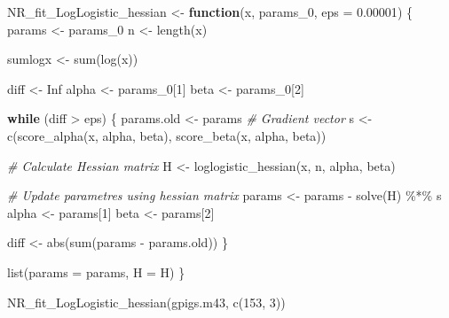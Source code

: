 \documentclass[
]{article}
\newenvironment{Shaded}{\begin{snugshade}}{\end{snugshade}}
\newcommand{\AttributeTok}[1]{\textcolor[rgb]{0.77,0.63,0.00}{#1}}
\newcommand{\CommentTok}[1]{\textcolor[rgb]{0.56,0.35,0.01}{\textit{#1}}}
\newcommand{\ConstantTok}[1]{\textcolor[rgb]{0.00,0.00,0.00}{#1}}
\newcommand{\ControlFlowTok}[1]{\textcolor[rgb]{0.13,0.29,0.53}{\textbf{#1}}}
\newcommand{\DecValTok}[1]{\textcolor[rgb]{0.00,0.00,0.81}{#1}}
\newcommand{\FloatTok}[1]{\textcolor[rgb]{0.00,0.00,0.81}{#1}}
\newcommand{\FunctionTok}[1]{\textcolor[rgb]{0.00,0.00,0.00}{#1}}
\newcommand{\NormalTok}[1]{#1}
\newcommand{\OtherTok}[1]{\textcolor[rgb]{0.56,0.35,0.01}{#1}}
\newcommand{\SpecialCharTok}[1]{\textcolor[rgb]{0.00,0.00,0.00}{#1}}
\begin{document}
\begin{Shaded}
\begin{Highlighting}[]
\NormalTok{NR\_fit\_LogLogistic\_hessian }\OtherTok{\textless{}{-}} \ControlFlowTok{function}\NormalTok{(x, params\_0, }\AttributeTok{eps =} \FloatTok{0.00001}\NormalTok{)}
\NormalTok{\{}
\NormalTok{  params }\OtherTok{\textless{}{-}}\NormalTok{ params\_0}
\NormalTok{  n }\OtherTok{\textless{}{-}} \FunctionTok{length}\NormalTok{(x)}
  
\NormalTok{  sumlogx }\OtherTok{\textless{}{-}} \FunctionTok{sum}\NormalTok{(}\FunctionTok{log}\NormalTok{(x))}
  
\NormalTok{  diff }\OtherTok{\textless{}{-}} \ConstantTok{Inf}
\NormalTok{  alpha }\OtherTok{\textless{}{-}}\NormalTok{ params\_0[}\DecValTok{1}\NormalTok{]}
\NormalTok{  beta }\OtherTok{\textless{}{-}}\NormalTok{ params\_0[}\DecValTok{2}\NormalTok{]}
  
  \ControlFlowTok{while}\NormalTok{ (diff }\SpecialCharTok{\textgreater{}}\NormalTok{ eps)}
\NormalTok{  \{}
\NormalTok{    params.old }\OtherTok{\textless{}{-}}\NormalTok{ params}
    \CommentTok{\# Gradient vector}
\NormalTok{    s }\OtherTok{\textless{}{-}} \FunctionTok{c}\NormalTok{(}\FunctionTok{score\_alpha}\NormalTok{(x, alpha, beta), }\FunctionTok{score\_beta}\NormalTok{(x, alpha, beta))}
    
    \CommentTok{\# Calculate Hessian matrix}
\NormalTok{    H }\OtherTok{\textless{}{-}} \FunctionTok{loglogistic\_hessian}\NormalTok{(x, n, alpha, beta)}
    
    \CommentTok{\# Update parametres using hessian matrix}
\NormalTok{    params }\OtherTok{\textless{}{-}}\NormalTok{ params }\SpecialCharTok{{-}} \FunctionTok{solve}\NormalTok{(H) }\SpecialCharTok{\%*\%}\NormalTok{ s}
\NormalTok{    alpha }\OtherTok{\textless{}{-}}\NormalTok{ params[}\DecValTok{1}\NormalTok{]}
\NormalTok{    beta }\OtherTok{\textless{}{-}}\NormalTok{ params[}\DecValTok{2}\NormalTok{]}
    
\NormalTok{    diff }\OtherTok{\textless{}{-}} \FunctionTok{abs}\NormalTok{(}\FunctionTok{sum}\NormalTok{(params }\SpecialCharTok{{-}}\NormalTok{ params.old))}
\NormalTok{  \}}
  
  \FunctionTok{list}\NormalTok{(}\AttributeTok{params =}\NormalTok{ params, }\AttributeTok{H =}\NormalTok{ H)}
\NormalTok{\}}

\FunctionTok{NR\_fit\_LogLogistic\_hessian}\NormalTok{(gpigs.m43, }\FunctionTok{c}\NormalTok{(}\DecValTok{153}\NormalTok{, }\DecValTok{3}\NormalTok{))}
\end{Highlighting}
\end{Shaded}
\end{document}

